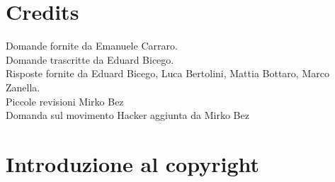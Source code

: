 \documentclass[a4paper]{article}
\begin{document}
	\section{Credits}
	Domande fornite da Emanuele Carraro. \\
	Domande trascritte da Eduard Bicego. \\
	Risposte fornite da Eduard Bicego, Luca Bertolini, Mattia Bottaro, Marco Zanella.\\
	Piccole revisioni Mirko Bez \\
	Domanda sul movimento Hacker aggiunta da Mirko Bez \\
	
	\section{Introduzione al copyright}
	
\end{document}
